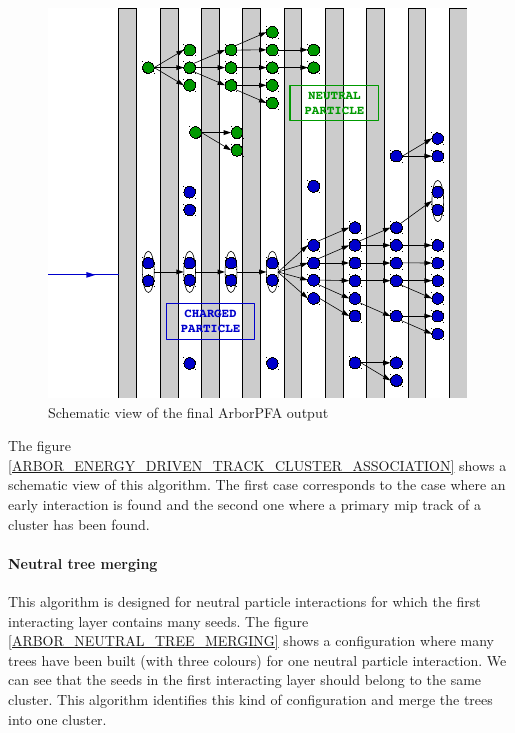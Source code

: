 \documentclass[cits]{JINST}
\begin{document}
\begin{figure}
  \vspace{-30pt}
  \begin{center}
    \includegraphics[width=\linewidth]{PfoCreation.pdf}
  \end{center}
  \vspace{-10pt}
  \caption{\label{ARBOR_PFO_CREATION} Schematic view of the final ArborPFA output}
  \vspace{-20pt}
\end{figure}

The figure \ref{ARBOR_ENERGY_DRIVEN_TRACK_CLUSTER_ASSOCIATION} shows a schematic view of this algorithm. The first case corresponds to the case where an early interaction is found and the second one where a primary mip track of a cluster has been found.

\paragraph*{Neutral tree merging} This algorithm is designed for neutral particle interactions for which the first interacting layer contains many seeds. The figure \ref{ARBOR_NEUTRAL_TREE_MERGING} shows a configuration where many trees have been built (with three colours) for one neutral particle interaction. We can see that the seeds in the first interacting layer should belong to the same cluster. This algorithm identifies this kind of configuration and merge the trees into one cluster.
\end{document}
